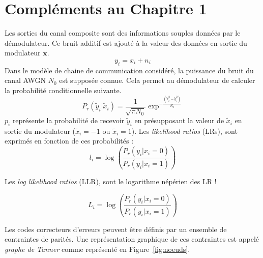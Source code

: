 

{
\appendix

\chapter{Compléments au Chapitre 1}
\label{append:decoding_nodes}
}
{
\label{append:decoding_nodes}
}

Les sorties du canal composite sont des informations souples données par le démodulateur.
Ce bruit additif est ajouté à la valeur des données en sortie du modulateur $\mathbold{x}$.
\begin{equation}
y_i = x_i + n_i
\end{equation}
Dans le modèle de chaine de communication considéré, la puissance du bruit du canal AWGN $N_0$ est supposée connue.
Cela permet au démodulateur de calculer la probabilité conditionnelle suivante.
\begin{equation}
	P_r( \tilde{y}_i|\tilde{x}_i) = \dfrac{1}{\sqrt{\pi N_0}}\exp^{-\tfrac{(\tilde{x}_i^2-\tilde{y}_i^2)}{N_0}}
\end{equation}
$p_i$ représente la probabilité de recevoir $\tilde{y}_i$ en présupposant la valeur de $\tilde{x}_i$ en sortie du modulateur ($\tilde{x}_i=-1$ ou $\tilde{x}_i=1$). Les \textit{likelihood ratios} (LRs), sont exprimés en fonction de ces probabilités :
\begin{equation}
	l_i = \log\left(\dfrac{P_r(y_i | x_i = 0)}{P_r(y_i | x_i = 1)}\right)
\end{equation}
\label{eq:lr}

Les \textit{log likelihood ratios} (LLR), sont le logarithme népérien des LR ! 

\begin{equation}
  L_i = \log\left(\dfrac{P_r(y_i | x_i = 0)}{P_r(y_i | x_i = 1)}\right)
\end{equation}
\label{eq:llr}


Les codes correcteurs d'erreurs peuvent être définis par un ensemble de contraintes de parités. Une représentation graphique de ces contraintes est appelé \textit{graphe de Tanner} comme représenté en Figure~\ref{fig:noeuds}.

